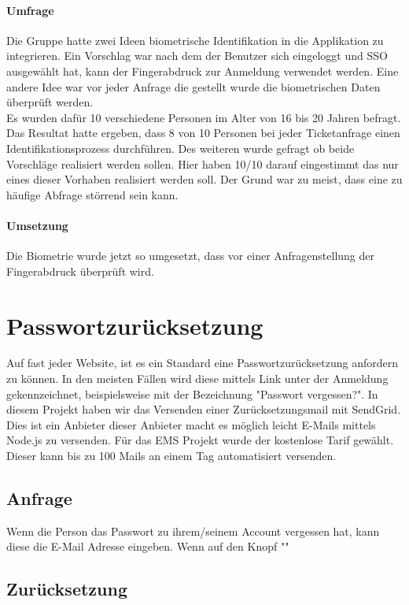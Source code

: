 \paragraph{Umfrage} Die Gruppe hatte zwei Ideen biometrische Identifikation in die Applikation zu integrieren. Ein Vorschlag war nach dem der Benutzer sich eingeloggt und SSO ausgewählt hat, kann der Fingerabdruck zur Anmeldung verwendet werden.
Eine andere Idee war vor jeder Anfrage die gestellt wurde die biometrischen Daten überprüft werden.
\\
Es wurden dafür 10 verschiedene Personen im Alter von 16 bis 20 Jahren befragt. Das Resultat hatte ergeben, dass 8 von 10 Personen bei jeder Ticketanfrage einen Identifikationsprozess durchführen.
Des weiteren wurde gefragt ob beide Vorschläge realisiert werden sollen. Hier haben 10/10 darauf eingestimmt das nur eines dieser Vorhaben realisiert werden soll. Der Grund war zu meist, dass eine zu häufige Abfrage störrend sein kann.

\paragraph{Umsetzung} Die Biometrie wurde jetzt so umgesetzt, dass vor einer Anfragenstellung der Fingerabdruck überprüft wird.

\section{Passwortzurücksetzung}
Auf fast jeder Website, ist es ein Standard eine Passwortzurücksetzung anfordern zu können. In den meisten Fällen wird diese mittels Link unter der Anmeldung gekennzeichnet, beispielsweise mit der Bezeichnung "Passwort vergessen?".
In diesem Projekt haben wir das Versenden einer Zurücksetzungsmail mit SendGrid. Dies ist ein Anbieter dieser Anbieter macht es möglich leicht E-Mails mittels Node.js zu versenden.
Für das EMS Projekt wurde der kostenlose Tarif gewählt. Dieser kann bis zu 100 Mails an einem Tag automatisiert versenden.

\subsection{Anfrage}
Wenn die Person das Passwort zu ihrem/seinem Account vergessen hat, kann diese die E-Mail Adresse eingeben. Wenn auf den Knopf ""

\subsection{Zurücksetzung}

